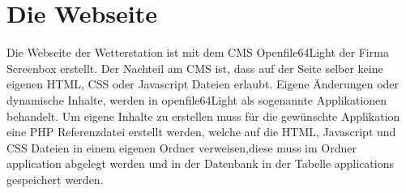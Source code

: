 \section{Die Webseite}
Die Webseite der Wetterstation ist mit dem CMS Openfile64Light der Firma Screenbox erstellt. Der Nachteil am CMS ist, dass auf der Seite selber keine eigenen HTML, CSS oder Javascript Dateien erlaubt. Eigene Änderungen oder dynamische Inhalte, werden in openfile64Light als sogenannte Applikationen behandelt. Um eigene Inhalte zu erstellen muss für die gewünschte Applikation eine PHP Referenzdatei erstellt werden, welche auf die HTML, Javascript und CSS Dateien in einem eigenen Ordner verweisen,diese muss im Ordner application abgelegt werden und in der Datenbank in der Tabelle applications gespeichert werden.\\

